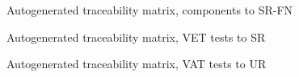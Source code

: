 \documentclass[a4paper,10pt]{article}
\begin{document}
  \begin{figure}[htbp]
    \centering\traceabilityCompFN
    \caption{Autogenerated traceability matrix, components to SR-FN}
  \end{figure}

  \begin{figure}[htbp]
    \centering\traceabilityVETSR
    \caption{Autogenerated traceability matrix, VET tests to SR}
  \end{figure}

  \begin{figure}[htbp]
    \centering\traceabilityVATUR
    \caption{Autogenerated traceability matrix, VAT tests to UR}
  \end{figure}
\end{document}

